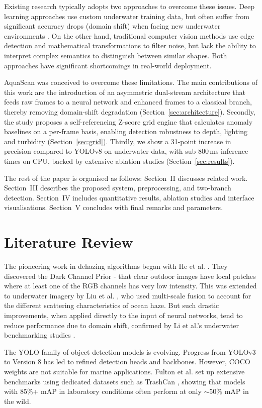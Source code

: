 \documentclass[conference]{IEEEtran}
\begin{document}
Existing research typically adopts two approaches to overcome these issues. Deep learning approaches use custom underwater training data, but often suffer from significant accuracy drops (domain shift) when facing new underwater environments \cite{b3}. On the other hand, traditional computer vision methods use edge detection and mathematical transformations to filter noise, but lack the ability to interpret complex semantics to distinguish between similar shapes. Both approaches have significant shortcomings in real-world deployment.

AquaScan was conceived to overcome these limitations. The main contributions of this work are the introduction of an asymmetric dual-stream architecture that feeds raw frames to a neural network and enhanced frames to a classical branch, thereby removing domain-shift degradation (Section~\ref{sec:architecture}). Secondly, the study proposes a self-referencing Z-score grid engine that calculates anomaly baselines on a per-frame basis, enabling detection robustness to depth, lighting and turbidity (Section~\ref{sec:grid}). Thirdly, we show a 31-point increase in precision compared to YOLOv8 on underwater data, with sub-800\,ms inference times on CPU, backed by extensive ablation studies (Section~\ref{sec:results}).

The rest of the paper is organised as follows: Section~II discusses related work. Section~III describes the proposed system, preprocessing, and two-branch detection. Section~IV includes quantitative results, ablation studies and interface visualisations. Section~V concludes with final remarks and parameters.

\section{Literature Review}
The pioneering work in dehazing algorithms began with He et al. \cite{b7}. They discovered the Dark Channel Prior - that clear outdoor images have local patches where at least one of the RGB channels has very low intensity. This was extended to underwater imagery by Liu et al. \cite{b2}, who used multi-scale fusion to account for the different scattering characteristics of ocean haze. But such drastic improvements, when applied directly to the input of neural networks, tend to reduce performance due to domain shift, confirmed by Li et al.'s underwater benchmarking studies \cite{b12}.

The YOLO family of object detection models is evolving. Progress from YOLOv3 \cite{b13} to Version 8 \cite{b1} has led to refined detection heads and backbones. However, COCO weights are not suitable for marine applications. Fulton et al. \cite{b3} set up extensive benchmarks using dedicated datasets such as TrashCan \cite{b11}, showing that models with 85\%+ mAP in laboratory conditions often perform at only $\sim$50\% mAP in the wild.
\end{document}
